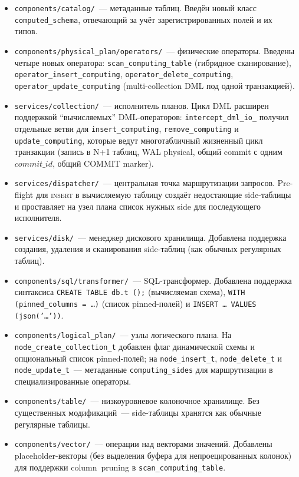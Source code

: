 \begin{itemize}
    \item \texttt{components/catalog/}~--- метаданные таблиц.
    Введён новый класс \texttt{computed\_schema}, отвечающий за
    учёт зарегистрированных полей и их типов.
    \item \texttt{components/physical\_plan/operators/}~---
    физические операторы. Введены четыре новых оператора:
    \texttt{scan\_computing\_table} (гибридное сканирование),
    \texttt{operator\_insert\_computing},
    \texttt{operator\_delete\_computing},
    \texttt{operator\_update\_computing} (multi-collection DML под
    одной транзакцией).
    \item \texttt{services/collection/}~--- исполнитель планов.
    Цикл DML расширен поддержкой ``вычисляемых''
    DML-операторов: \texttt{intercept\_dml\_io\_} получил отдельные
    ветви для \texttt{insert\_computing},
    \texttt{remove\_computing} и \texttt{update\_computing},
    которые ведут многотабличный жизненный цикл транзакции (запись
    в N+1 таблиц, WAL physical, общий commit с одним
    $\mathit{commit\_id}$, общий COMMIT marker).
    \item \texttt{services/dispatcher/}~--- центральная точка
    маршрутизации запросов. Pre-flight для \textsc{insert} в
    вычисляемую таблицу создаёт недостающие side-таблицы и
    проставляет на узел плана список нужных side для последующего
    исполнителя.
    \item \texttt{services/disk/}~--- менеджер дискового
    хранилища. Добавлена поддержка создания, удаления и сканирования
    side-таблиц (как обычных регулярных таблиц).
    \item \texttt{components/sql/transformer/}~--- SQL-трансформер.
    Добавлена поддержка синтаксиса \texttt{CREATE TABLE db.t~();}
    (вычисляемая схема), \texttt{WITH (pinned\_columns~=~\ldots)}
    (список pinned-полей) и \texttt{INSERT \ldots\ VALUES (json('\ldots'))}.
    \item \texttt{components/logical\_plan/}~--- узлы логического
    плана. На \texttt{node\_create\_collection\_t} добавлен флаг
    динамической схемы и опциональный список pinned-полей; на
    \texttt{node\_insert\_t}, \texttt{node\_delete\_t} и
    \texttt{node\_update\_t}~--- метаданные \texttt{computing\_sides}
    для маршрутизации в специализированные операторы.
    \item \texttt{components/table/}~--- низкоуровневое колоночное
    хранилище. Без существенных модификаций~--- side-таблицы
    хранятся как обычные регулярные таблицы.
    \item \texttt{components/vector/}~--- операции над векторами
    значений. Добавлены placeholder-векторы (без выделения буфера
    для непроецированных колонок) для поддержки column~pruning в
    \texttt{scan\_computing\_table}.
\end{itemize}

